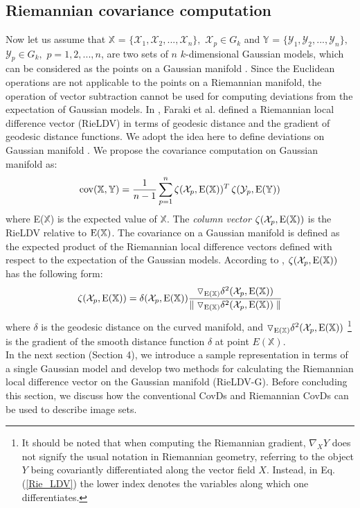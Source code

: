 \documentclass[review]{elsarticle}
\begin{document}
\subsection{Riemannian covariance computation}
	\indent Now let us assume that $\mathbb{X}$ = $\{\mathcal{X}_1,$$\mathcal{X}_2,$$...,$$\mathcal{X}_n \},$ $\mathcal{X}_p \in G_k$ and $\mathbb{Y}$ = $\{\mathcal{Y}_1,$$\mathcal{Y}_2,$$...,$$\mathcal{Y}_n \},$ $\mathcal{Y}_p \in G_k,$ $p=1,2,...,n$, are two sets of $n$ $k$-dimensional Gaussian models, which can be considered as the points on a Gaussian manifold \cite{wang2016towards}. Since the Euclidean operations are not applicable to the points on a Riemannian manifold, the operation of vector subtraction cannot be used for computing deviations from the expectation of Gaussian models. In \cite{faraki2015more}, Faraki et al. defined a Riemannian local difference vector (RieLDV) in terms of  geodesic distance and the gradient of geodesic distance functions. We adopt the idea here to define deviations on Gaussian manifold \cite{wang2016towards}. We propose the covariance computation on Gaussian manifold as:
\begin{equation}
\label{Rie_CovComputation}
\mathop {\rm cov}(\mathbb{X},\mathbb{Y}) = \frac{1}{n-1}\sum_{p=1}^n\zeta(\mathcal{X}_p,{\rm E}(\mathbb{X}))^T\,\zeta(\mathcal{Y}_p,{\rm E}(\mathbb{Y}))
\end{equation} 
where E($\mathbb{X}$) is the expected value of $\mathbb{X}$. The \emph{column vector} $\zeta(\mathcal{X}_p,{\rm E}(\mathbb{X}))$ is the RieLDV relative to ${\rm E}(\mathbb{X})$. The covariance on a Gaussian manifold is defined as the expected product of the Riemannian local difference vectors defined with respect to the expectation of the  Gaussian models. According to \cite{faraki2015more}, $\zeta(\mathcal{X}_p,{\rm E}(\mathbb{X}))$ has the following form:
\begin{equation}
\label{Rie_LDV}
\mathop \zeta(\mathcal{X}_p,{\rm E}(\mathbb{X})) = {\delta}(\mathcal{X}_p,{\rm E}(\mathbb{X}))\frac{\triangledown_{{\rm E}(\mathbb{X})}\delta^2(\mathcal{X}_p,{\rm E}(\mathbb{X}))}{\parallel\triangledown_{{\rm E}(\mathbb{X})}\delta^2(\mathcal{X}_p,{\rm E}(\mathbb{X}))\parallel}
\end{equation}
where $\delta$ is the geodesic distance on the curved manifold, and $\triangledown_{{\rm E}(\mathbb{X})}\delta^2(\mathcal{X}_p,{\rm E}(\mathbb{X}))$ \footnote{It should be noted that when computing the Riemannian gradient,  $\nabla_{X}Y$ does not signify the usual notation in Riemannian geometry, referring to the object $Y$ being covariantly differentiated along the vector field $X$. Instead, in {Eq.(\ref{Rie_LDV})} the lower index denotes the variables along which one differentiates.} is the gradient of the smooth distance function $\delta$ at point $E(\mathbb{X})$. \\
	\indent In the next section (Section 4), we introduce a sample representation in terms of a single Gaussian model and develop two methods for calculating the Riemannian local difference vector on the Gaussian manifold (RieLDV-G). Before concluding this section, we discuss how the conventional CovDs and Riemannian CovDs can be used to describe image sets.
\end{document}
